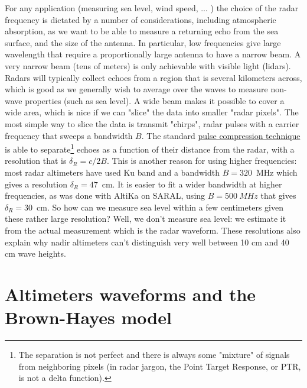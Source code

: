 For any application (measuring sea level, wind speed, ... ) the choice of the radar frequency is dictated by 
a number of considerations, including atmospheric absorption, as we want to be able to measure a returning echo from the sea surface, and the 
size of the antenna. In particular, low frequencies give large wavelength that require a proportionally large antenna to have a narrow beam. A very narrow beam (tens of meters) is only achievable with visible light (lidars). Radars will typically collect echoes from a region that is several kilometers across, which is good as we generally wish to average over the waves to measure non-wave properties (such as sea level). A wide beam makes it possible to cover a wide area, which is nice if we can "slice" the data into smaller "radar pixels". The most simple way to slice the data is transmit "chirps", radar pulses with a carrier frequency that sweeps a bandwidth $B$. The standard \href{https://en.wikipedia.org/wiki/Pulse_compression}{pulse compression technique} is able to separate\footnote{The separation is not perfect and there is always some "mixture" of signals from neighboring pixels (in radar jargon, the Point Target Response, or PTR, is not a delta function).} echoes as a function of their distance from the radar, with a resolution that is $\delta_R=c/2B$.  This is another reason for using higher frequencies: most radar altimeters have used Ku band and a bandwidth $B=320$~MHz which gives a resolution $\delta_R=47$~cm. It is easier to fit a wider bandwidth at higher frequencies, as was done with AltiKa on SARAL, using $B=500~MHz$ that gives $\delta_R=30$~cm. So how can we measure sea level within a few centimeters given these rather large resolution?  Well, we don't measure sea level: we estimate it from the actual measurement which is the radar waveform. These resolutions also explain why nadir altimeters can't distinguish very well between 10 cm and 40 cm wave heights.


\section{Altimeters waveforms and the Brown-Hayes model}

